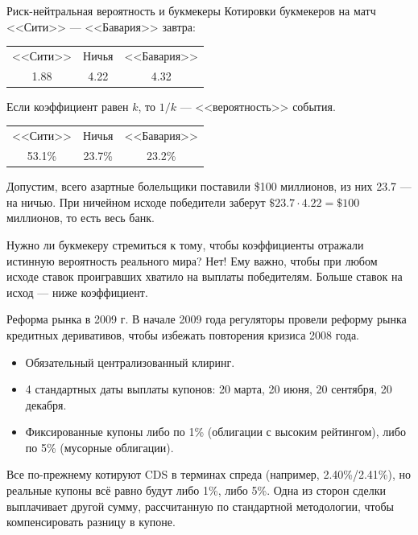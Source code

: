 \documentclass{beamer}
\begin{document}
\begin{frame}{Риск-нейтральная вероятность и букмекеры}
\justify
Котировки букмекеров на матч <<Сити>> --- <<Бавария>> завтра:

\centering
\begin{tabular}{c|c|c}
<<Сити>> & Ничья & <<Бавария>> \\
1.88 & 4.22 & 4.32
\end{tabular}

\justify
Если коэффициент равен $k$, то $1/k$ --- <<вероятность>> события.

\centering
\begin{tabular}{c|c|c}
<<Сити>> & Ничья & <<Бавария>> \\
53.1\% & 23.7\% & 23.2\%
\end{tabular}

\justify
Допустим, всего азартные болельщики поставили \$100 миллионов, из них 23.7 --- на ничью. При 
ничейном исходе победители заберут $\$23.7 \cdot 4.22 = \$100$ миллионов, то 
есть весь банк.

\justify
Нужно ли букмекеру стремиться к тому, чтобы коэффициенты отражали истинную вероятность реального мира? Нет! Ему важно, чтобы при любом исходе ставок проигравших хватило на выплаты победителям. Больше ставок на исход --- ниже коэффициент.
\end{frame}



\begin{frame}{Реформа рынка в 2009 г.}
\justify
В начале 2009 года регуляторы провели реформу рынка кредитных деривативов, чтобы избежать повторения кризиса 2008 года.

\begin{itemize}
\justifying
\item Обязательный централизованный клиринг.
\item 4 стандартных даты выплаты купонов: 20 марта, 20 июня, 20 сентября, 20 декабря.
\item Фиксированные купоны либо по 1\% (облигации с высоким рейтингом), либо по 5\% (мусорные облигации).
\end{itemize}

\justify
Все по-прежнему котируют CDS в терминах спреда (например, 2.40\%/2.41\%), но реальные купоны всё равно будут либо 1\%, либо 5\%. Одна из сторон сделки выплачивает другой сумму, рассчитанную по стандартной методологии, чтобы компенсировать разницу в купоне.
\end{frame}
\end{document}
